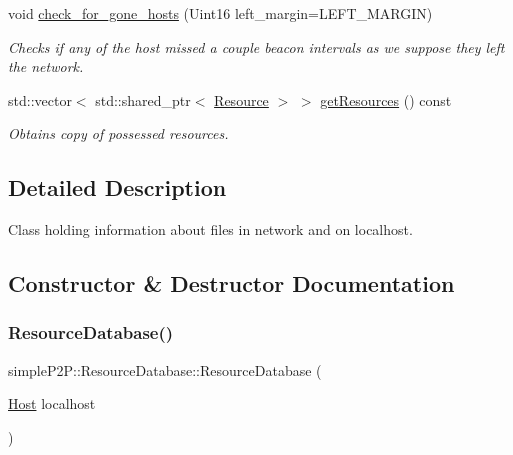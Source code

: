 \begin{DoxyCompactItemize}
void \hyperlink{classsimpleP2P_1_1ResourceDatabase_a98531f381542ba5c0ec28f455f56ec26}{check\+\_\+for\+\_\+gone\+\_\+hosts} (Uint16 left\+\_\+margin=L\+E\+F\+T\+\_\+\+M\+A\+R\+G\+IN)
\begin{DoxyCompactList}\small\item\em Checks if any of the host missed a couple beacon intervals as we suppose they left the network. \end{DoxyCompactList}\item 
std\+::vector$<$ std\+::shared\+\_\+ptr$<$ \hyperlink{classsimpleP2P_1_1Resource}{Resource} $>$ $>$ \hyperlink{classsimpleP2P_1_1ResourceDatabase_a85e304c650a0a3d5cd2395587befceeb}{get\+Resources} () const
\begin{DoxyCompactList}\small\item\em Obtains copy of possessed resources. \end{DoxyCompactList}\end{DoxyCompactItemize}


\subsection{Detailed Description}
Class holding information about files in network and on localhost. 

\subsection{Constructor \& Destructor Documentation}
\mbox{\label{classsimpleP2P_1_1ResourceDatabase_a6fb45392300235160204e9666267eb51}} 
\subsubsection{\texorpdfstring{Resource\+Database()}{ResourceDatabase()}}
{\footnotesize\ttfamily simple\+P2\+P\+::\+Resource\+Database\+::\+Resource\+Database (\begin{DoxyParamCaption}\item[{\hyperlink{classsimpleP2P_1_1Host}{Host}}]{localhost }\end{DoxyParamCaption})}



